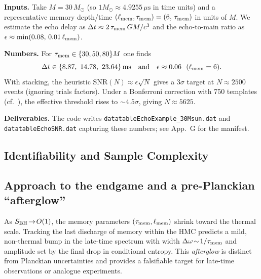 \documentclass[11pt,a4paper]{article}
\theoremstyle{plain}
\theoremstyle{definition}
\theoremstyle{remark}
\begin{document}
\noindent\textbf{Inputs.} Take $M=30\,M_\odot$ (so $1M_\odot\approx 4.9255\,\mu\mathrm{s}$ in time units) and a representative memory depth/time $(\ell_{\rm mem},\tau_{\rm mem})=(6,\,\tau_{\rm mem})$ in units of $M$. We estimate the echo delay as $\Delta t \approx 2\,\tau_{\rm mem}\,GM/c^3$ and the echo-to-main ratio as $\epsilon\approx \min(0.08,\,0.01\,\ell_{\rm mem})$.

\noindent\textbf{Numbers.} For $\tau_{\rm mem}\in\{30,50,80\}M$ one finds
\[
\Delta t \in \{8.87,\ 14.78,\ 23.64\}\,\mathrm{ms}\quad\text{and}\quad \epsilon\approx 0.06\ \ (\ell_{\rm mem}=6).
\]
With stacking, the heuristic $\mathrm{SNR}(N)\approx \epsilon\sqrt{N}$ gives a $3\sigma$ target at $N\approx 2500$ events (ignoring trials factors). Under a Bonferroni correction with {750} templates (cf.\ ), the effective threshold rises to $\sim 4.5\sigma$, giving $N\approx 5625$.

\noindent\textbf{Deliverables.} The code writes \texttt{datatableEchoExample\_30Msun.dat} and \texttt{datatableEchoSNR.dat} capturing these numbers; see App.~G for the manifest.

\subsection{Identifiability and Sample Complexity}

\subsection*{Approach to the endgame and a pre-Planckian ``afterglow''}
\label{sec:afterglow}
As $S_{\rm BH}\!\to\!O(1)$, the memory parameters $(\tau_{\rm mem},\ell_{\rm mem})$ shrink toward the thermal scale.
Tracking the last discharge of memory within the HMC predicts a mild, non-thermal bump in the late-time spectrum with width $\Delta\omega\!\sim\!1/\tau_{\rm mem}$ and amplitude set by the final drop in conditional entropy.
This \emph{afterglow} is distinct from Planckian uncertainties and provides a falsifiable target for late-time observations or analogue experiments.

\end{document}
